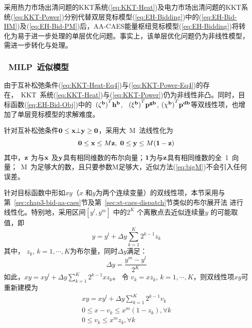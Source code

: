 采用热力市场出清问题的KKT系统(\ref{eq:KKT-Heat})及电力市场出清问题的KKT系统(\ref{eq:KKT-Power})分别代替双层竞标模型(\ref{eq:EH-Bidding})中的(\ref{eq:EH-Bid-HM})及(\ref{eq:EH-Bid-PM})后，AA-CAES能量枢纽竞标模型(\ref{eq:EH-Bidding})将转化为易于进一步处理的单层优化问题。事实上，该单层优化问题仍为非线性模型，需进一步转化与处理。

\subsubsection{~MILP~近似模型}
由于互补松弛条件(\ref{eq:KKT-Heat-Eq4})与(\ref{eq:KKT-Power-Eq4})的存在，~KKT~系统(\ref{eq:KKT-Heat})与(\ref{eq:KKT-Power})仍为非线性非凸。同时，目标函数(\ref{eq:EH-Bid-Obj})中的~${(\bf \zeta^b)}^T {\bf h^{b}}$, ~${(\bf \xi^b)}^T {\bf p^{gb}}$,  ${(\bf \chi^b)}^T {\bf p^{db}}$等双线性项，也增加了单层竞标模型的求解难度。

针对互补松弛条件$\bf 0 \le  x \bot y \ge 0$，采用大~M~法\cite{Big-M-1981}线性化为
\begin{equation}
{\bf 0} \le {\bf x} \le M {\bf z},~
{\bf 0} \le {\bf y} \le M ({\bf 1-z})
\label{eq:bigM}
\end{equation}
其中，$\bf z$ 为与$\bf x$ 及$\bf y$具有相同维数的布尔向量；$\bf 1$为与$\bf z$具有相同维数的全~1~向量；~M~为足够大的数，且只要参数M足够大，近似方法(\ref{eq:bigM})不会引入任何误差。

针对目标函数中形如$xy$（$x$ 和$y$为两个连续变量）的双线性项，本节采用与第~\ref{sec:chap3-bid-aa-caes}节及第~\ref{sec:st-caes-dispatch}节类似的布尔展开法\cite{Binary-Expansion-1,Binary-Expansion-2} 进行线性化。特别地，采用区间$[y^l,y^m]$ 中的$2^K$ 个离散点去近似连续量$y$ 的可能取值，即
\begin{equation}
\label{eq:Binary-Expansion}
y = y^l + \Delta y \sum_{k=1}^K 2^{k-1} z_k
\end{equation}
其中， $z_k$, $k=1,\cdots,K$为布尔量，同时$\Delta y$满足：
\begin{equation}
\label{eq:Delta-y}
\Delta y = \dfrac{y^m-y^l}{2^K}
\end{equation}
如此，$xy = x y^l + \Delta y \sum_{k=1}^K 2^{k-1} x z_k$。 令 $v_k = x z_k$, $k=1,\cdots,K$，则双线性项$xy$可重新建模为
\begin{subequations}
\label{eq:Binary-Expansion-xy}
\begin{gather}
x y = x y^l + \Delta y \sum_{k=1}^K 2^{k-1} v_k \label{eq:xy-BE-1}\\
0 \le x-v_{k} \le x^m (1-z_k), \forall k \label{eq:xy-BE-2}\\
0 \le v_k \le x^m z_k, \forall k \label{eq:xy-BE-3}
\end{gather}
\end{subequations}

